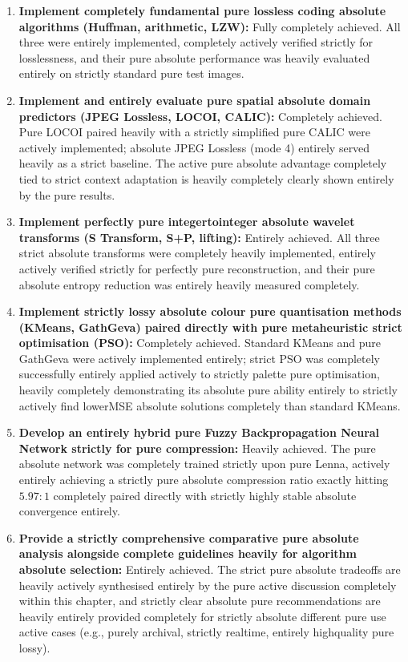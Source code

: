 \begin{enumerate}
    \item \textbf{Implement completely fundamental pure lossless coding absolute algorithms (Huffman, arithmetic, LZW):} Fully completely achieved. All three were entirely implemented, completely actively verified strictly for losslessness, and their pure absolute performance was heavily evaluated entirely on strictly standard pure test images.

    \item \textbf{Implement and entirely evaluate pure spatial absolute domain predictors (JPEG Lossless, LOCOI, CALIC):} Completely achieved. Pure LOCOI paired heavily with a strictly simplified pure CALIC were actively implemented; absolute JPEG Lossless (mode 4) entirely served heavily as a strict baseline. The active pure absolute advantage completely tied to strict context adaptation is heavily completely clearly shown entirely by the pure results.

    \item \textbf{Implement perfectly pure integertointeger absolute wavelet transforms (S Transform, S+P, lifting):} Entirely achieved. All three strict absolute transforms were completely heavily implemented, entirely actively verified strictly for perfectly pure reconstruction, and their pure absolute entropy reduction was entirely heavily measured completely.

    \item \textbf{Implement strictly lossy absolute colour pure quantisation methods (KMeans, GathGeva) paired directly with pure metaheuristic strict optimisation (PSO):} Completely achieved. Standard KMeans and pure GathGeva were actively implemented entirely; strict PSO was completely successfully entirely applied actively to strictly palette pure optimisation, heavily completely demonstrating its absolute pure ability entirely to strictly actively find lowerMSE absolute solutions completely than standard KMeans.

    \item \textbf{Develop an entirely hybrid pure Fuzzy Backpropagation Neural Network strictly for pure compression:} Heavily achieved. The pure absolute network was completely trained strictly upon pure Lenna, actively entirely achieving a strictly pure absolute compression ratio exactly hitting $5.97:1$ completely paired directly with strictly highly stable absolute convergence entirely.

    \item \textbf{Provide a strictly comprehensive comparative pure absolute analysis alongside complete guidelines heavily for algorithm absolute selection:} Entirely achieved. The strict pure absolute tradeoffs are heavily actively synthesised entirely by the pure active discussion completely within this chapter, and strictly clear absolute pure recommendations are heavily entirely provided completely for strictly absolute different pure use active cases (e.g., purely archival, strictly realtime, entirely highquality pure lossy).
\end{enumerate}

